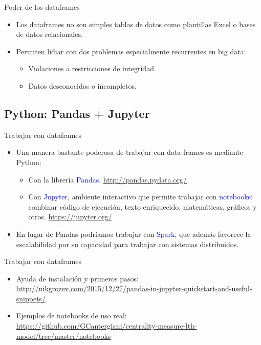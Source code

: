 \documentclass[handout]{beamer} %
\newcommand{\blue}[1]{\textcolor{blue}{#1}}
\begin{document}
\begin{frame}{Poder de los dataframes}
  \begin{itemize}
    \item Los dataframes no son simples tablas de datos como plantillas Excel o bases de datos relacionales.
    \item Permiten lidiar con dos problemas especialmente recurrentes en big data:
    \begin{itemize}
        \item<2-> Violaciones a restricciones de integridad.
        \item<2-> Datos desconocidos o incompletos.
    \end{itemize}
  \end{itemize}
\end{frame}

\subsection{Python: Pandas + Jupyter}

\begin{frame}{Trabajar con dataframes}
  \begin{itemize}
    \item Una manera bastante poderosa de trabajar con data frames es mediante Python:
    \begin{itemize}
        \item Con la librería \blue{Pandas}.
        \url{http://pandas.pydata.org/}
        \item Con \blue{Jupyter}, ambiente interactivo que permite trabajar con \blue{notebooks}: combinar código de ejecución, texto enriquecido, matemáticas, gráficos y otros. \url{https://jupyter.org/}
    \end{itemize}
    \item En lugar de Pandas podríamos trabajar con \blue{Spark}, que además favorece la escalabilidad por su capacidad para trabajar con sistemas distribuidos.
  \end{itemize}
\end{frame}

\begin{frame}{Trabajar con dataframes}
  \begin{itemize}
    \item Ayuda de instalación y primeros pasos:\\ \blue{\url{http://nikgrozev.com/2015/12/27/pandas-in-jupyter-quickstart-and-useful-snippets/}}
    \item Ejemplos de notebooks de uso real:\\ \blue{\url{https://github.com/GCantergiani/centrality-measure-lth-model/tree/master/notebooks}}
  \end{itemize}
\end{frame}
\end{document}
